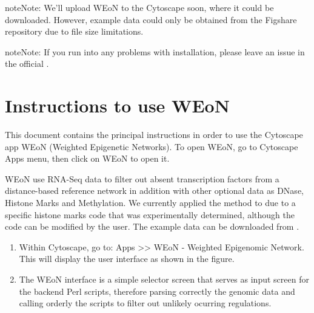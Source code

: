 \documentclass[letterpaper,10pt,english]{sphinxmanual}
\begin{document}
\begin{sphinxadmonition}{note}{Note:}
 We’ll upload WEoN to the Cytoscape
 soon, where it could be downloaded. However, example data could only be obtained from the Figshare repository due to file size limitations.
\end{sphinxadmonition}

\begin{sphinxadmonition}{note}{Note:}
If you run into any problems with installation, please leave an issue in the
official .
\end{sphinxadmonition}


\chapter{Instructions to use WEoN}
\label{\detokenize{use_instructions:instructions-to-use-weon}}\label{\detokenize{use_instructions::doc}}
This document contains the principal instructions in order to use the Cytoscape
app WEoN (Weighted Epigenetic Networks). To open WEoN, go to Cytoscape Apps menu,
then click on WEoN to open it.

WEoN use RNA-Seq data to filter out absent transcription factors from a distance-based reference network in addition with other optional data as DNase, Histone Marks and Methylation. We currently applied the method to  due to a specific histone marks code that was experimentally determined, although the code can be modified by the user. The example data can be downloaded from .
\begin{enumerate}
\def\theenumi{\arabic{enumi}}
\def\labelenumi{\theenumi .}
\makeatletter\def\p@enumii{\p@enumi \theenumi .}\makeatother
\setcounter{enumi}{-1}
\item {} 

Within Cytoscape, go to: Apps \textgreater{}\textgreater{} WEoN - Weighted Epigenomic Network. This will display the user interface as shown in the figure.

\item {} 

The WEoN interface is a simple selector screen that serves as input screen for
the backend Perl scripts, therefore parsing correctly the genomic data and
calling orderly the scripts to filter out unlikely ocurring regulations.

\end{enumerate}
\end{document}
